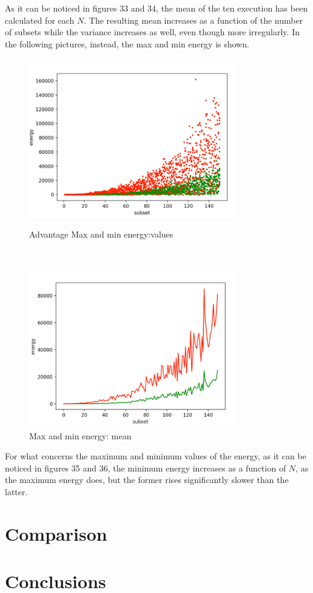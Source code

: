 \documentclass[oneside,a4paper]{article}
\begin{document}
As it can be noticed in figures 33 and 34, the mean of the ten execution has been calculated for each $N$. The resulting mean increases as a function of the number of subsets while the variance increases as well, even though more irregularly. In the following pictures, instead, the max and min energy is shown.
\newpage
\begin{figure}[htp]
\begin{minipage}[b]{9cm}
\centering
\includegraphics[width=9cm]{LaTeXTemplate/Images/MaxMinAdvValues.png}
\caption{Advantage Max and min energy:values}
\end{minipage}
\ \hspace{2mm} \hspace{2mm} \
\begin{minipage}[b]{9cm}
\centering
\includegraphics[width=9cm]{LaTeXTemplate/Images/MaxMinAdvMean.png}
\caption{Max and min energy: mean}
\end{minipage}
\end{figure}

For what concerns the maximum and minimum values of the energy, as it can be noticed in figures 35 and 36, the minimum energy increases as a function of $N$, as the maximum energy does, but the former rises significantly slower than the latter.

\section{Comparison}
\section{Conclusions}



\end{document}
